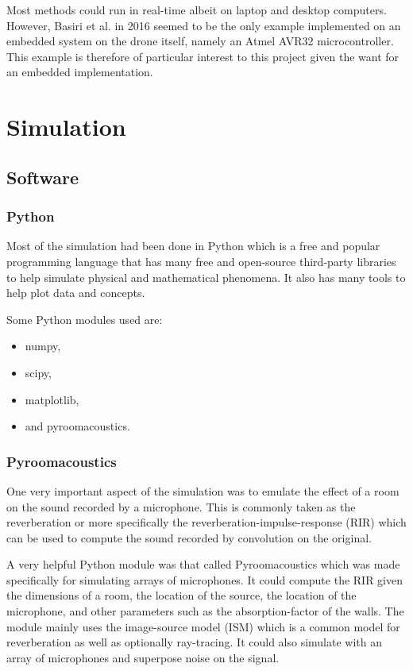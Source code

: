 \documentclass[notitlepage]{report}
\begin{document}
Most methods could run in real-time albeit on laptop and desktop computers. However, Basiri et al. in 2016 \cite{basiri_-board_2016} seemed to be the only example implemented on an embedded system on the drone itself, namely an Atmel AVR32 microcontroller. This example is therefore of particular interest to this project given the want for an embedded implementation.




\chapter{Simulation}

\section{Software}

\subsection{Python}

Most of the simulation had been done in Python which is a free and popular programming language that has many free and open-source third-party libraries to help simulate physical and mathematical phenomena. It also has many tools to help plot data and concepts.

Some Python modules used are:
\begin{itemize}
	\item numpy,
	\item scipy,
	\item matplotlib,
	\item and pyroomacoustics.
\end{itemize}

\subsection{Pyroomacoustics}

One very important aspect of the simulation was to emulate the effect of a room on the sound recorded by a microphone. This is commonly taken as the reverberation or more specifically the reverberation-impulse-response (RIR) which can be used to compute the sound recorded by convolution on the original.

A very helpful Python module was that called Pyroomacoustics which was made specifically for simulating arrays of microphones. It could compute the RIR given the dimensions of a room, the location of the source, the location of the microphone, and other parameters such as the absorption-factor of the walls. The module mainly uses the image-source model (ISM) which is a common model for reverberation as well as optionally ray-tracing. It could also simulate with an array of microphones and superpose noise on the signal.
\end{document}
